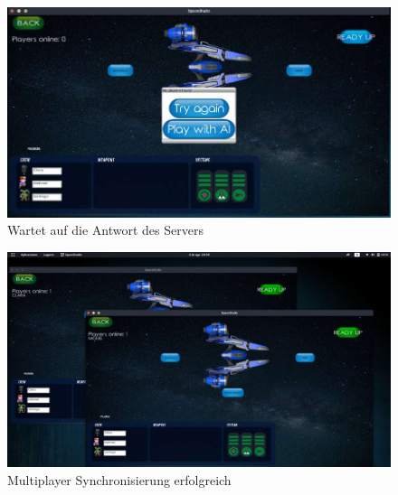 \documentclass[12pt]{article}
\begin{document}
\begin{figure}[htp]
	\centering
	\includegraphics[scale=0.48]{TestProtocolBilder/Multiplayer/3.jpg}
	\caption{Wartet auf die Antwort des Servers}
\end{figure}
\begin{figure}[htp]
	\centering
	\includegraphics[scale=0.4]{TestProtocolBilder/Multiplayer/4.jpg}
	\caption{Multiplayer Synchronisierung erfolgreich}
\end{figure}
\end{document}
